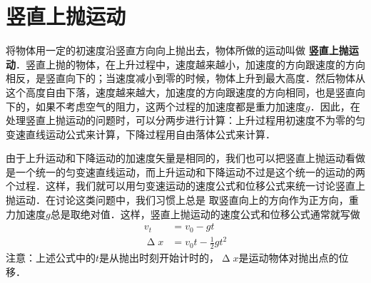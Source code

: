 \newpage

\section{竖直上抛运动}
将物体用一定的初速度沿竖直方向向上抛出去，物体所做的运动叫做\textbf{ 竖直上抛运动}．竖直上抛的物体，在上升过程中，速度越来越小，加速度的方向跟速度的方向相反，是竖直向下的；当速度减小到零的时候，物体上升到最大高度．然后物体从这个高度自由下落，速度越来越大，加速度的方向跟速度的方向相同，也是竖直向下的，如果不考虑空气的阻力，这两个过程的加速度都是重力加速度$g$．因此，在处理竖直上抛运动的问题时，可以分两步进行计算：上升过程用初速度不为零的匀变速直线运动公式来计算，下降过程用自由落体公式来计算．

由于上升运动和下降运动的加速度矢量是相同的，我们也可以把竖直上抛运动看做是一个统一的匀变速直线运动，而上升运动和下降运动不过是这个统一的运动的两个过程．这样，我们就可以用匀变速运动的速度公式和位移公式来统一讨论竖直上抛运动．在讨论这类问题中，我们习惯上总是
取竖直向上的方向作为正方向，重力加速度$g$总是取绝对值．这样，竖直上抛运动的速度公式和位移公式通常就写做
\[\begin{split}
        v_t        & =v_0-gt                \\
        \upDelta x & =v_0 t-\frac{1}{2}gt^2
    \end{split}\]
注意：上述公式中的$t$是从抛出时刻开始计时的，$\upDelta x$是运动物体对抛出点的位移．

